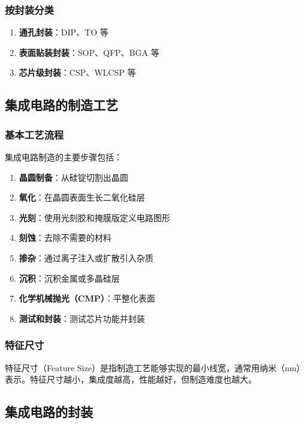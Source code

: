 \subsubsection{按封装分类}

\begin{enumerate}
  \item \textbf{通孔封装}：DIP、TO 等
  \item \textbf{表面贴装封装}：SOP、QFP、BGA 等
  \item \textbf{芯片级封装}：CSP、WLCSP 等
\end{enumerate}

\subsection{集成电路的制造工艺}

\subsubsection{基本工艺流程}

集成电路制造的主要步骤包括：

\begin{enumerate}
  \item \textbf{晶圆制备}：从硅锭切割出晶圆
  \item \textbf{氧化}：在晶圆表面生长二氧化硅层
  \item \textbf{光刻}：使用光刻胶和掩膜版定义电路图形
  \item \textbf{刻蚀}：去除不需要的材料
  \item \textbf{掺杂}：通过离子注入或扩散引入杂质
  \item \textbf{沉积}：沉积金属或多晶硅层
  \item \textbf{化学机械抛光（CMP）}：平整化表面
  \item \textbf{测试和封装}：测试芯片功能并封装
\end{enumerate}

\subsubsection{特征尺寸}

特征尺寸（Feature Size）是指制造工艺能够实现的最小线宽，通常用纳米（nm）表示。特征尺寸越小，集成度越高，性能越好，但制造难度也越大。

\subsection{集成电路的封装}

